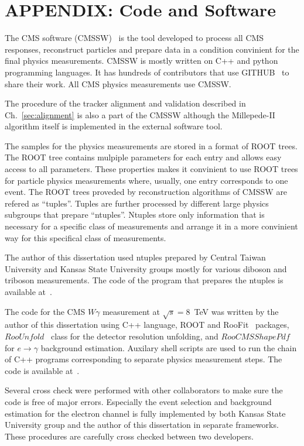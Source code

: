 \section{APPENDIX: Code and Software}
\label{sec:Code}


The CMS software (CMSSW)~\cite{ref_CMSSW} is the tool developed to process all CMS responses, reconstruct particles and prepare data in a condition convinient for the final physics measurements. CMSSW is mostly written on C++ and python programming languages. It has hundreds of contributors that use GITHUB~\cite{ref_GITHUB} to share their work. All CMS physics measurements use CMSSW.

The procedure of the tracker alignment and validation described in Ch.~\ref{sec:alignment} is also a part of the CMSSW although the Millepede-II algorithm itself is implemented in the external software tool.

The samples for the physics measurements are stored in a format of ROOT trees. The ROOT tree contains mulpiple parameters for each entry and allows easy access to all parameters. These properties makes it convinient to use ROOT trees for particle physics measurements where, usually, one entry corresponds to one event. The ROOT trees proveded by reconstruction algorithms of CMSSW are refered as ``tuples''. Tuples are further processed by different large physics subgroups that prepare ``ntuples''. Ntuples store only information that is necessary for a specific class of measurements and arrange it in a more convinient way for this specifical class of measurements.  

The author of this dissertation used ntuples prepared by Central Taiwan University and Kansas State University groups mostly for various diboson and triboson measurements. The code of the program that prepares the ntuples is available at~\cite{ref_ggNtuplizer}.

The code for the CMS $W\gamma$ measurement at $\sqrt{s}=8$~TeV was written by the author of this dissertation using C++ language, ROOT and RooFit~\cite{ref_RooFit} packages, $RooUnfold$~\cite{ref_RooUnfold} class for the detector resolution unfolding, and $RooCMSShapePdf$~\cite{ref_RooCMSShapePdf} for $e\rightarrow\gamma$ background estimation. Auxilary shell scripts are used to run the chain of C++ programs corresponding to separate physics measurement steps. The code is available at~\cite{ref_GITHUB}.

Several cross check were performed with other collaborators to make sure the code is free of major errors. Especially the event selection and background estimation for the electron channel is fully implemented by both Kansas State University group and the author of this dissertation in separate frameworks. These procedures are carefully cross checked between two developers.  
